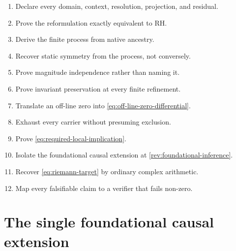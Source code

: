 \documentclass[11pt,a4paper]{article}
\theoremstyle{definition}
\begin{document}
\begin{keybox}[title={\bfseries Processual proof contract},fontupper=\small]
\begin{enumerate}[label=\textbf{\arabic*.},leftmargin=*]
  \item Declare every domain, context, resolution, projection, and residual.
  \item Prove the reformulation exactly equivalent to RH.
  \item Derive the finite process from native ancestry.
  \item Recover static symmetry from the process, not conversely.
  \item Prove magnitude independence rather than naming it.
  \item Prove invariant preservation at every finite refinement.
  \item Translate an off-line zero into \cref{eq:off-line-zero-differential}.
  \item Exhaust every carrier without presuming exclusion.
  \item Prove \cref{eq:required-local-implication}.
  \item Isolate the foundational causal extension at
        \cref{rev:foundational-inference}.
  \item Recover \cref{eq:riemann-target} by ordinary complex arithmetic.
  \item Map every falsifiable claim to a verifier that fails non-zero.
\end{enumerate}
\end{keybox}

\section{The single foundational causal extension}
\label{sec:foundational-inference}
\end{document}
